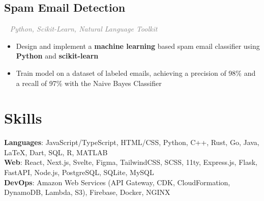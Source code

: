 \documentclass{article}
\newcommand{\resumesection}[3]{
    \subsection*{#1}
    \ 
    \normalsize
    \normalsize
    \hfill
    \textcolor{black}{#3}
    \normalsize
    \newline
    \small
    \textcolor{grey}{\emph{#2}}
}
\begin{document}
\resumesection{Spam Email Detection}{Python, Scikit-Learn, Natural Language Toolkit}{}
\begin{itemize}
	\item Design and implement a \textbf{machine learning} based spam email classifier using \textbf{Python} and \textbf{scikit-learn}
	\item Train model on a dataset of labeled emails, achieving a precision of 98\% and a recall of 97\% with the Naive Bayes Classifier
\end{itemize}



\section*{Skills}
\textbf{Languages}: JavaScript/TypeScript, HTML/CSS, Python, C++, Rust, Go, Java, {\selectfont\LaTeX}, Dart, SQL, R, MATLAB\\
\textbf{Web}: React, Next.js, Svelte, Figma, TailwindCSS, SCSS, 11ty, Express.js, Flask, FastAPI, Node.js, PostgreSQL, SQLite, MySQL\\
\textbf{DevOps}: Amazon Web Services (API Gateway, CDK, CloudFormation, DynamoDB, Lambda, S3), Firebase, Docker, NGINX\\
\end{document}
